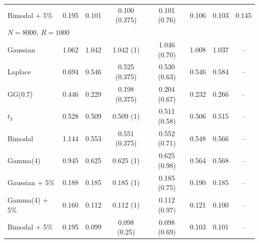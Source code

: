 \begin{tabular}{lccccccc}
Bimodal + 5\% & 0.195 & 0.101 & 0.100 (0.375) & 0.101 (0.76) & 0.106 & 0.103 & 0.145 \\
\multicolumn{8}{l}{\emph{$N=8000$, $R=1000$}} \\
Gaussian & 1.062 & 1.042 & 1.042 (1) & 1.046 (0.70) & 1.008 & 1.037 & -- \\
Laplace & 0.694 & 0.546 & 0.525 (0.375) & 0.530 (0.63) & 0.546 & 0.584 & -- \\
GG(0.7) & 0.446 & 0.229 & 0.198 (0.375) & 0.204 (0.67) & 0.232 & 0.266 & -- \\
$t_3$ & 0.528 & 0.509 & 0.509 (1) & 0.511 (0.58) & 0.506 & 0.515 & -- \\
Bimodal & 1.144 & 0.553 & 0.551 (0.375) & 0.552 (0.71) & 0.548 & 0.566 & -- \\
Gamma(4) & 0.945 & 0.625 & 0.625 (1) & 0.625 (0.98) & 0.564 & 0.568 & -- \\
Gaussian + 5\% & 0.188 & 0.185 & 0.185 (1) & 0.185 (0.75) & 0.190 & 0.185 & -- \\
Gamma(4) + 5\% & 0.160 & 0.112 & 0.112 (1) & 0.112 (0.97) & 0.121 & 0.100 & -- \\
Bimodal + 5\% & 0.195 & 0.099 & 0.098 (0.25) & 0.098 (0.69) & 0.103 & 0.101 & -- \\
\bottomrule
\end{tabular}

